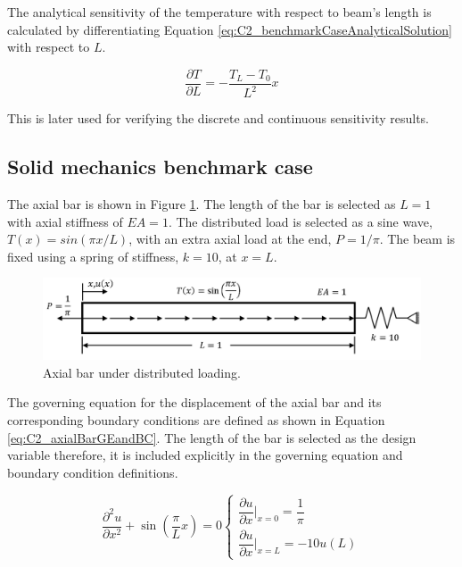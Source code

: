 The analytical sensitivity of the temperature with respect to beam's length is calculated by differentiating Equation \eqref{eq:C2_benchmarkCaseAnalyticalSolution} with respect to $L$.

\begin{equation}
	\frac{\partial T}{\partial L} = -\frac{T_L - T_0}{L^2} x
\end{equation}

This is later used for verifying the discrete and continuous sensitivity results.

\subsection{Solid mechanics benchmark case}
The axial bar is shown in Figure \ref{fig:C2_axialBarPhysicalShape}. The length of the bar is selected as $L = 1$ with axial stiffness of $EA = 1$. The distributed load is selected as a sine wave, $T(x) = sin(\pi x/L)$, with an extra axial load at the end, $P = 1 / \pi$. The beam is fixed using a spring of stiffness, $k = 10$, at $x = L$.

\begin{figure}[h]
	\centering
	\includegraphics[width=14.00cm]{Chapter_2/figure/solid_mechanics_benchmark.png}
	\caption{Axial bar under distributed loading.}
	\label{fig:C2_axialBarPhysicalShape}
\end{figure}

The governing equation for the displacement of the axial bar and its corresponding boundary conditions are defined as shown in Equation \eqref{eq:C2_axialBarGEandBC}. The length of the bar is selected as the design variable therefore, it is included explicitly in the governing equation and boundary condition definitions.

\begin{subequations}
\begin{equation}\label{eq:C2_axialBarGE}
	\frac{\partial^2 u}{\partial x^2} + \sin \left( \frac{\pi}{L} x \right) = 0
\end{equation}
\begin{equation}\label{eq:C2_axialBarBC}
	\begin{cases}
	\dfrac{\partial u}{\partial x} \bigg|_{x = 0} = \dfrac{1}{\pi} \\
	\dfrac{\partial u}{\partial x} \bigg|_{x = L} = -10 u(L)
	\end{cases}
\end{equation}
\end{subequations}\label{eq:C2_axialBarGEandBC}

